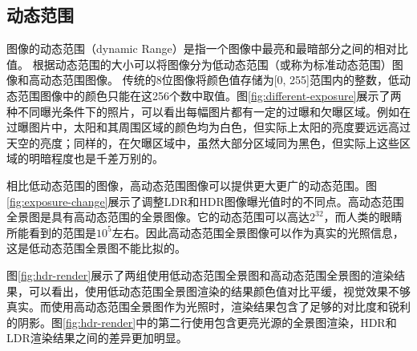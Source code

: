 \subsection{动态范围}

图像的动态范围（dynamic Range）是指一个图像中最亮和最暗部分之间的相对比值\cite{wikipedia}。
根据动态范围的大小可以将图像分为低动态范围（或称为标准动态范围）图像和高动态范围图像。
传统的8位图像将颜色值存储为[0, 255]范围内的整数，低动态范围图像中的颜色只能在这256个数中取值。图\ref{fig:different-exposure}展示了两种不同曝光条件下的照片，可以看出每幅图片都有一定的过曝和欠曝区域。例如在过曝图片中，太阳和其周围区域的颜色均为白色，但实际上太阳的亮度要远远高过天空的亮度；同样的，在欠曝区域中，虽然大部分区域同为黑色，但实际上这些区域的明暗程度也是千差万别的。


相比低动态范围的图像，高动态范围图像可以提供更大更广的动态范围。图\ref{fig:exposure-change}展示了调整LDR和HDR图像曝光值时的不同点。高动态范围全景图是具有高动态范围的全景图像。它的动态范围可以高达$2^{32}$，而人类的眼睛所能看到的范围是$10^5$左右\cite{wikipedia}。因此高动态范围全景图像可以作为真实的光照信息，这是低动态范围全景图不能比拟的。


图\ref{fig:hdr-render}展示了两组使用低动态范围全景图和高动态范围全景图的渲染结果，可以看出，使用低动态范围全景图渲染的结果颜色值对比平缓，视觉效果不够真实。而使用高动态范围全景图作为光照时，渲染结果包含了足够的对比度和锐利的阴影。图\ref{fig:hdr-render}中的第二行使用包含更亮光源的全景图渲染，HDR和LDR渲染结果之间的差异更加明显。

